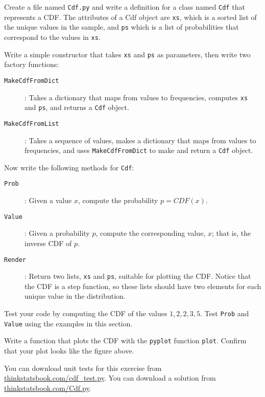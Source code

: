 \documentclass[10pt]{book}
\begin{document}
\begin{ex}
Create a file named {\tt Cdf.py} and write a definition for a class
named {\tt Cdf} that represents a CDF.  The attributes of a Cdf
object are {\tt xs}, which is a sorted list of the unique values
in the sample, and {\tt ps} which is a list of probabilities that
correspond to the values in {\tt xs}.

Write a simple constructor that takes {\tt xs} and {\tt ps} as
parameters, then write two factory functions:

\begin{description}

\item[{\tt MakeCdfFromDict}]: Takes a dictionary that maps from
values to frequencies, computes {\tt xs} and {\tt ps}, and returns
a {\tt Cdf} object.

\item[{\tt MakeCdfFromList}]: Takes a sequence of values, makes
a dictionary that maps from values to frequencies, and uses
{\tt MakeCdfFromDict} to make and return a {\tt Cdf} object.

\end{description}

Now write the following methods for {\tt Cdf}:

\begin{description}

\item[{\tt Prob}]: Given a value $x$, compute the probability $p = CDF(x)$.

\item[{\tt Value}]: Given a probability $p$, compute the
corresponding value, $x$; that is, the inverse CDF of $p$.

\item[{\tt Render}]: Return two lists, {\tt xs} and {\tt ps}, suitable
for plotting the CDF.  Notice that the CDF is a step function, so these
lists should have two elements for each unique value in the distribution.

\end{description}

Test your code by computing the CDF of the values ${1, 2, 2, 3, 5}$.
Test {\tt Prob} and {\tt Value} using the examples in this section.

Write a function that plots the CDF with the {\tt pyplot} function
{\tt plot}.  Confirm that your plot looks like the figure above.

You can download unit tests for this exercise from
\url{thinkstatsbook.com/cdf_test.py}.  You can download a solution
from \url{thinkstatsbook.com/Cdf.py}.

\end{ex}
\end{document}
